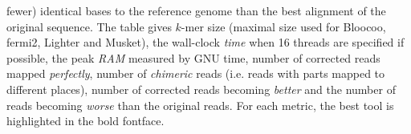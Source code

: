 \documentclass{bioinfo}
\begin{document}
\begin{table}[t]
{fewer) identical bases to the reference genome than the best alignment of the
original sequence. The table gives $k$-mer size (maximal size used for Bloocoo,
fermi2, Lighter and Musket), the wall-clock \emph{time} when 16 threads are
specified if possible, the peak \emph{RAM} measured by GNU time, number of
corrected reads mapped \emph{perfectly}, number of \emph{chimeric} reads (i.e. reads with parts mapped to different places),
number of corrected reads becoming \emph{better} and the number of reads
becoming \emph{worse} than the original reads. For each metric, the best tool
is highlighted in the bold fontface.}
\end{table}
\end{document}
